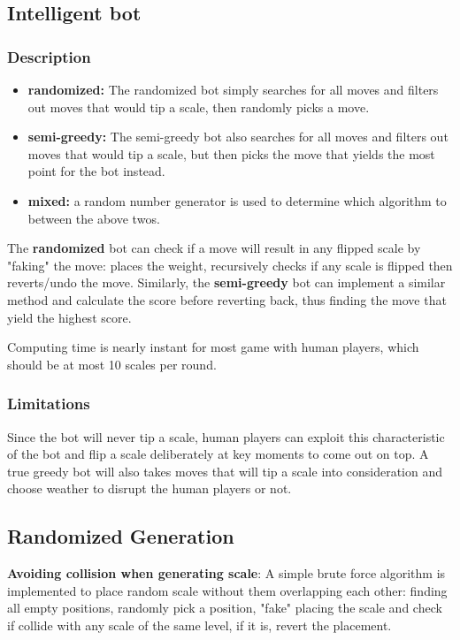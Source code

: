 \documentclass[12pt]{article}
\begin{document}
\subsection{Intelligent bot}
\subsubsection{Description}
\begin{itemize}
  \item \textbf{randomized:} The randomized bot simply searches for all moves
    and filters out moves that would tip a scale, then randomly picks a move.
  \item \textbf{semi-greedy:} The semi-greedy bot also searches for all moves
    and filters out moves that would tip a scale, but then picks the move that
    yields the most point for the bot instead.
  \item \textbf{mixed:} a random number generator is used to determine which
    algorithm to between the above twos.
\end{itemize}
The \textbf{randomized} bot can check if a move will result in any flipped scale
by "faking" the move: places the weight, recursively checks if any scale is
flipped then reverts/undo the move. Similarly, the \textbf{semi-greedy} bot can
implement a similar method and calculate the score before reverting back, thus
finding the move that yield the highest score.

Computing time is nearly instant for most game with human players, which should
be at most 10 scales per round. 

\subsubsection{Limitations}
Since the bot will never tip a scale, human players can exploit this
characteristic of the bot and flip a scale deliberately at key moments to come
out on top. A true greedy bot will also takes moves that will tip a scale into
consideration and choose weather to disrupt the human players or not.

\subsection{Randomized Generation}

\textbf{Avoiding collision when generating scale}: 
A simple brute force algorithm is implemented to place random scale without them
overlapping each other: finding all empty positions, randomly pick a position,
"fake" placing the scale and check if collide with any scale of the same level,
if it is, revert the placement.
\end{document}
